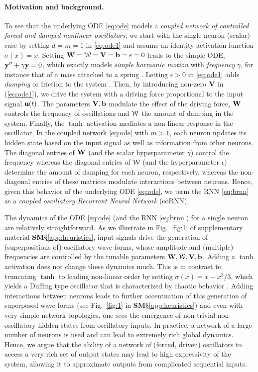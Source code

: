 \documentclass{article} \usepackage{iclr2021_conference,times}
\newcommand{\cW}{\EuScript{W}}
\newcommand{\by}{{\bf y}}
\newcommand{\bW}{{\bf W}}
\newcommand{\bu}{{\bf u}}
\newcommand{\bb}{{\bf b}}
\newcommand{\bV}{{\bf V}}
\newcommand{\ep}{\epsilon}
\newcommand{\fref}[1] {Fig.~\ref{#1}}
\begin{document}
\paragraph{Motivation and background.} To see that the underlying ODE \eqref{eq:ode} models a \emph{coupled network of controlled forced and damped nonlinear oscillators}, we start with the single neuron (scalar) case by setting $d=m=1$ in \eqref{eq:ode1} and assume an identity activation function $\sigma(x) = x$. Setting $\bW=\cW=\bV=\bb=\ep=0$ leads to the simple ODE, $\by^{\prime \prime} + \gamma \by = 0$, which exactly models \emph{simple harmonic motion} with \emph{frequency} $\gamma$, for instance that of a mass attached to a spring \citep{GHbook}. Letting $\ep > 0$ in \eqref{eq:ode1} adds \emph{damping} or friction to the system \citep{GHbook}. Then, by introducing non-zero $\bV$ in (\ref{eq:ode1}), we drive the system with a driving force proportional to the input signal $\bu(t)$. The parameters $\bV,\bb$ modulate the effect of the driving force, $\bW$ controls the frequency of oscillations and $\cW$ the amount of damping in the system. Finally, the $\tanh$ activation mediates a non-linear response in the oscillator. In the coupled network \eqref{eq:ode} with $m>1$, each neuron updates its hidden state based on the input signal as well as information from other neurons. The diagonal entries of $\bW$ (and the scalar hyperparameter $\gamma$) control the frequency whereas the diagonal entries of $\cW$ (and the hyperparameter $\epsilon$) determine the amount of damping for each neuron, respectively, whereas the non-diagonal entries of these matrices modulate interactions between neurons. Hence, given this behavior of the underlying ODE \eqref{eq:ode}, we term the RNN \eqref{eq:brnn} as a \emph{coupled oscillatory Recurrent Neural Network} (coRNN).

The dynamics of the ODE \eqref{eq:ode} (and the RNN \eqref{eq:brnn}) for a single neuron are relatively straightforward. As we illustrate in \fref{fig:1} of supplementary material {\bf SM}\S\ref{app:heuristics}, input signals drive the generation of (superpositions of) oscillatory wave-forms, whose amplitude and (multiple) frequencies are controlled by the tunable parameters $\bW,\cW,\bV,\bb$. Adding a $\tanh$ activation does not change these dynamics much. This is in contrast to truncating $\tanh$ to leading non-linear order by setting $\sigma(x) = x - x^3/3$, which yields a Duffing type oscillator that is characterized by chaotic behavior \citep{GHbook}. Adding interactions between neurons leads to further accentuation of this generation of superposed wave forms (see \fref{fig:1} in {\bf SM}\S\ref{app:heuristics}) and even with very simple network topologies, one sees the emergence of non-trivial non-oscillatory hidden states from oscillatory inputs. In practice, a network of a large number of neurons is used and can lead to extremely rich global dynamics. Hence, we argue that the ability of a network of (forced, driven) oscillators to access a very rich set of output states may lead to high expressivity of the system, allowing it to approximate outputs from complicated sequential inputs. 
\end{document}
